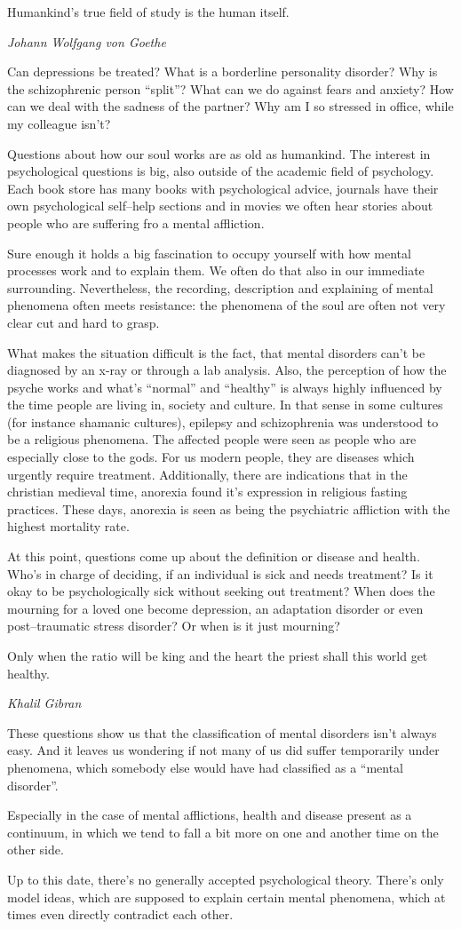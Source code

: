 \documentclass[../main.tex]{subfiles}
\begin{document}
\epigraph{Humankind's true field of study is the human itself.}{\textit{Johann Wolfgang von Goethe}}

Can depressions be treated?
What is a borderline personality disorder?
Why is the schizophrenic person ``split''?
What can we do against fears and anxiety?
How can we deal with the sadness of the partner?
Why am I so stressed in office, while my colleague isn't?

Questions about how our soul works are as old as humankind.
The interest in psychological questions is big, also outside of the academic field of psychology.
Each book store has many books with psychological advice, journals have their own psychological self--help sections
and in movies we often hear stories about people who are suffering fro a mental affliction.

Sure enough it holds a big fascination to occupy yourself with how mental processes work and to explain them.
We often do that also in our immediate surrounding.
Nevertheless, the recording, description and explaining of mental phenomena often meets resistance:
the phenomena of the soul are often not very clear cut and hard to grasp.

What makes the situation difficult is the fact, that mental disorders
can't be diagnosed by an x-ray or through a lab analysis.
Also, the perception of how the psyche works and what's ``normal'' and ``healthy''
is always highly influenced by the time people are living in, society and culture.
In that sense in some cultures (for instance shamanic cultures),
epilepsy and schizophrenia was understood to be a religious phenomena.
The affected people were seen as people who are especially close to the gods.
For us modern people, they are diseases which urgently require treatment.
Additionally, there are indications that in the christian medieval time,
anorexia found it's expression in religious fasting practices.
These days, anorexia is seen as being the psychiatric affliction with the highest mortality rate.

At this point, questions come up about the definition or disease and health.
Who's in charge of deciding, if an individual is sick and needs treatment?
Is it okay to be psychologically sick without seeking out treatment?
When does the mourning for a loved one become depression, an adaptation disorder or even
post--traumatic stress disorder?
Or when is it just mourning?

\epigraph{Only when the ratio will be king and the heart the priest shall this world get healthy.}{\textit{Khalil Gibran}}

These questions show us that the classification of mental disorders isn't always easy.
And it leaves us wondering if not many of us did suffer temporarily under phenomena,
which somebody else would have had classified as a ``mental disorder''.

Especially in the case of mental afflictions, health and disease present as a continuum,
in which we tend to fall a bit more on one and another time on the other side.

Up to this date, there's no generally accepted psychological theory.
There's only model ideas, which are supposed to explain certain mental phenomena,
which at times even directly contradict each other.
\end{document}
